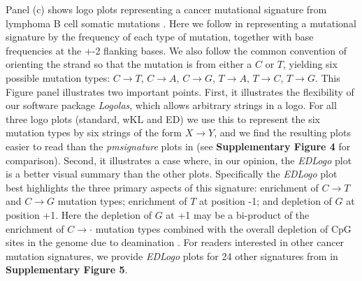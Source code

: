 \documentclass{bmcart}
\begin{document}
Panel (c) shows logo plots representing a cancer mutational signature from lymphoma B cell somatic mutations \cite{Alexandrov2013}. Here we follow \cite{Shiraishi2015} in representing a mutational signature by the
frequency of each type of mutation, together with base frequencies at the +-2 flanking bases. 
We also follow the common convention of orienting the
strand so that the mutation is from either a $C$ or $T$, yielding six possible mutation types: $C \rightarrow T$, $C \rightarrow A$, $C \rightarrow G$, $T \rightarrow A$, $T \rightarrow C$, $T \rightarrow G$.
This Figure panel illustrates two important points. First, it illustrates
the flexibility of our software package \textit{Logolas}, which allows arbitrary strings in a logo.
For all three logo plots (standard, wKL and ED) 
we use this to represent the six mutation types by six strings of the form $X \rightarrow Y$, and we find
the resulting plots easier to read than the \textit{pmsignature} plots in \cite{Shiraishi2015} (see \textbf{Supplementary Figure 4} for comparison). Second, it illustrates a case where, in our opinion, the
\textit{EDLogo} plot is a better visual summary than the other plots.
Specifically the \textit{EDLogo} plot best highlights the three primary 
aspects of this signature: enrichment of $C\rightarrow T$ and $C\rightarrow G$ mutation types; enrichment of $T$ at position -1; and depletion of $G$ at position +1.
Here the depletion of $G$ at +1 may be a bi-product of the enrichment of $C\rightarrow \cdot$ mutation types combined with the overall depletion of CpG sites in the genome due to deamination \cite{scarana1967}.   For readers interested in other cancer mutation signatures, we provide \textit{EDLogo} plots for 24 other signatures from \cite{Alexandrov2013} in \textbf{Supplementary Figure 5}. 
 


\end{document}

